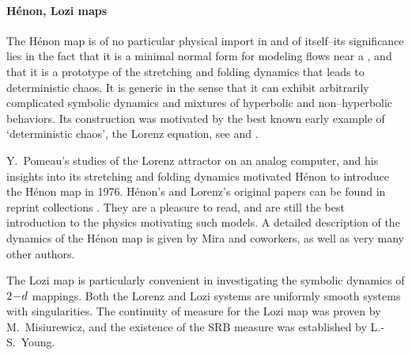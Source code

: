 \paragraph{H\'enon, Lozi maps}{
The H\'enon map%
is of no particular physical
import in and of itself--its significance lies in
the fact that it is a minimal normal form for modeling flows near a
\snbif,
and that it is a prototype of the stretching and folding dynamics that
leads to deterministic chaos.  It is generic in the sense that it can
exhibit arbitrarily complicated symbolic dynamics and mixtures of
hyperbolic and non--hyperbolic behaviors.  Its construction was
motivated by the best known early example of `deterministic chaos',
the Lorenz equation, see 
and .

 Y.~Pomeau's studies of the Lorenz
attractor on an analog computer, and his insights into its stretching
and folding dynamics motivated H\'enon to introduce
the H\'enon map in
1976.
H\'enon's and Lorenz's original papers can be found in reprint
collections .  They are a pleasure to read, and
are still the best introduction to the physics
motivating such models.
A detailed description of the dynamics of the H\'enon map is
given by Mira and coworkers, as well as very many other
authors.

The Lozi map is particularly convenient in investigating the
symbolic dynamics of $2\!-\!d$ mappings.  Both the Lorenz and Lozi
systems are uniformly smooth systems with singularities.
The continuity of measure
for the Lozi map
was proven by M.~Misiurewicz,
and the existence of the SRB measure was established by L.-S.~Young.
} %

